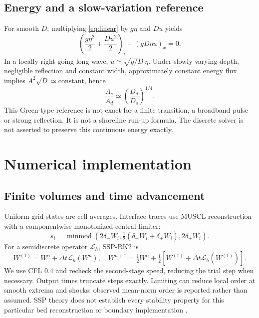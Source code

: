 \documentclass[11pt]{article}
\begin{document}
\subsection{Energy and a slow-variation reference}
For smooth $D$, multiplying \eqref{eq:linear} by $g\eta$ and $Du$ yields
\begin{equation}
 \left(\frac{g\eta^2}{2}+\frac{Du^2}{2}\right)_t+(gD\eta u)_x=0.
\end{equation}
In a locally right-going long wave, $u\simeq\sqrt{g/D}\,\eta$. Under slowly
varying depth, negligible reflection and constant width, approximately constant
energy flux implies $A^2\sqrt{D}\simeq\mathrm{constant}$, hence
\begin{equation}
 \frac{A_s}{A_d}\simeq\left(\frac{D_d}{D_s}\right)^{1/4}.
 \label{eq:green}
\end{equation}
This Green-type reference \cite{green} is not exact for a finite transition,
a broadband pulse or strong reflection. It is not a shoreline run-up formula.
The discrete solver is not asserted to preserve this continuous energy exactly.

\section{Numerical implementation}
\subsection{Finite volumes and time advancement}
Uniform-grid states are cell averages. Interface traces use MUSCL reconstruction
with a componentwise monotonized-central limiter:
\begin{equation}
 s_i=\operatorname{minmod}\left(2\delta_-W_i,
 \tfrac12(\delta_-W_i+\delta_+W_i),2\delta_+W_i\right).
\end{equation}
For a semidiscrete operator $\mathcal L_h$, SSP-RK2 is
\begin{equation}
 W^{(1)}=W^n+\Delta t\mathcal L_h(W^n),\quad
 W^{n+1}=\tfrac12 W^n+\tfrac12\left[W^{(1)}+
 \Delta t\mathcal L_h(W^{(1)})\right].
\end{equation}
We use CFL 0.4 and recheck the second-stage speed, reducing the trial step when
necessary. Output times truncate steps exactly. Limiting can reduce local order
at smooth extrema and shocks; observed mean-norm order is reported rather than
assumed. SSP theory does not establish every stability property for this particular
bed reconstruction or boundary implementation \cite{ssp}.
\end{document}
